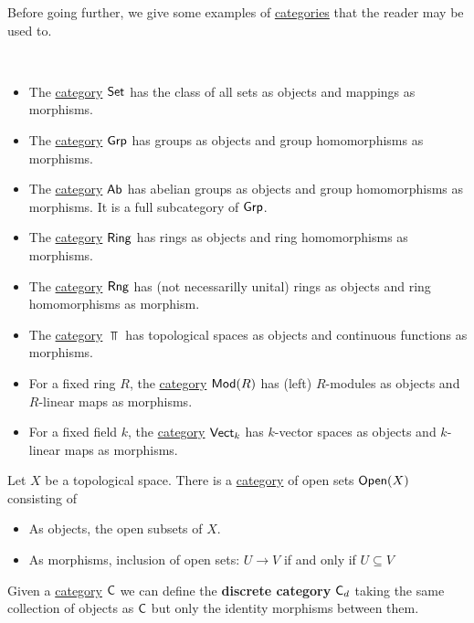 \documentclass[../../main]{subfiles}
\begin{document}
Before going further, we give some examples of \hyperref[def:category]{categories} that the reader may be used to.
\begin{example}~
  \begin{itemize}
    \item The \hyperref[def:category]{category} \(\mathsf{Set}\) has the class of all sets as objects and mappings as morphisms.
    \item The \hyperref[def:category]{category} \(\mathsf{Grp}\) has groups as objects and group homomorphisms as morphisms.
    \item The \hyperref[def:category]{category} \(\mathsf{Ab}\) has abelian groups as objects and group homomorphisms as morphisms. It is a full subcategory of \(\mathsf{Grp}\).
    \item The \hyperref[def:category]{category} \(\mathsf{Ring}\) has rings as objects and ring homomorphisms as morphisms.
    \item The \hyperref[def:category]{category} \(\mathsf{Rng}\) has (not necessarilly unital) rings as objects and ring homomorphisms as morphism.
    \item The \hyperref[def:category]{category} \(\Top\) has topological spaces as objects and continuous functions as morphisms.
    \item For a fixed ring \(R\), the \hyperref[def:category]{category} \(\mathsf{Mod}(R)\) has (left) \(R\)-modules as objects and \(R\)-linear maps as morphisms.
    \item For a fixed field \(k\), the \hyperref[def:category]{category} \(\mathsf{Vect}_{k}\) has \(k\)-vector spaces as objects and \(k\)-linear maps as morphisms.
  \end{itemize}
\end{example}

\begin{example}\label{ex:open-set-category}
  Let \(X\) be a topological space.
  There is a \hyperref[def:category]{category} of open sets \(\mathsf{Open}(X)\) consisting of
  \begin{itemize}
    \item As objects, the open subsets of \(X\).
    \item As morphisms, inclusion of open sets: \(U \to V\) if and only if \(U \subseteq V\)
  \end{itemize}
\end{example}

\begin{example}\label{ex:discrete-category}
  Given a \hyperref[def:category]{category} \(\mathsf{C}\) we can define the \textbf{discrete category} \(\mathsf{C}_{d}\) taking the same collection of objects as \(\mathsf{C}\) but only the identity morphisms between them.
\end{example}
\end{document}
